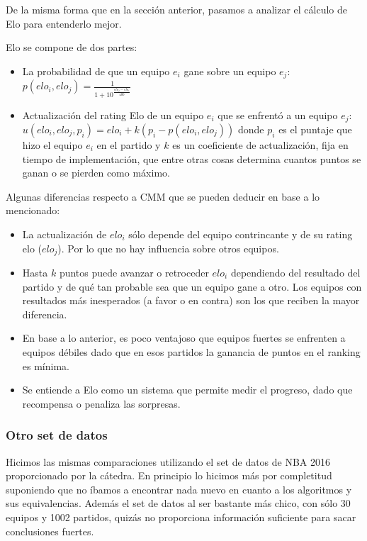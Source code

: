 De la misma forma que en la sección anterior, pasamos a analizar el cálculo de Elo para entenderlo mejor.

Elo se compone de dos partes:

\begin{itemize}
    \item La probabilidad de que un equipo $e_i$ gane sobre un equipo $e_j$: $p(elo_i, elo_j) = \frac{1}{1 + 10^{\frac{elo_j - elo_i}{400}}}$
    \item Actualización del rating Elo de un equipo $e_i$ que se enfrentó a un equipo $e_j$: $u(elo_i, elo_j, p_i) = elo_i + k(p_i - p(elo_i, elo_j))$ donde $p_i$ es el puntaje que hizo el equipo $e_i$ en el partido y $k$ es un coeficiente de actualización, fija en tiempo de implementación, que entre otras cosas determina cuantos puntos se ganan o se pierden como máximo.
\end{itemize}

Algunas diferencias respecto a CMM que se pueden deducir en base a lo mencionado:

\begin{itemize}
    \item La actualización de $elo_i$ sólo depende del equipo contrincante y de su rating elo ($elo_j$). Por lo que no hay influencia sobre otros equipos.
    \item Hasta $k$ puntos puede avanzar o retroceder $elo_i$ dependiendo del resultado del partido y de qué tan probable sea que un equipo gane a otro. Los equipos con resultados más inesperados (a favor o en contra) son los que reciben la mayor diferencia.
    \item En base a lo anterior, es poco ventajoso que equipos fuertes se enfrenten a equipos débiles dado que en esos partidos la ganancia de puntos en el ranking es mínima.
    \item Se entiende a Elo como un sistema que permite medir el progreso, dado que recompensa o penaliza las sorpresas.
\end{itemize}

\FloatBarrier
\subsubsection{Otro set de datos}
Hicimos las mismas comparaciones utilizando el set de datos de NBA 2016 proporcionado por la cátedra. En principio lo hicimos más por completitud suponiendo que no íbamos a encontrar nada nuevo en cuanto a los algoritmos y sus equivalencias. Además el set de datos al ser bastante más chico, con sólo 30 equipos y 1002 partidos, quizás no proporciona información suficiente para sacar conclusiones fuertes.

